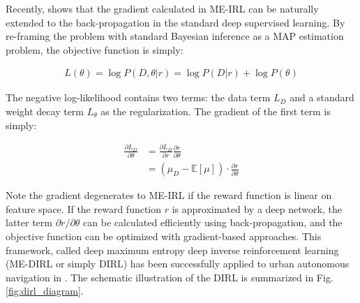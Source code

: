 \documentclass[../thesis.tex]{subfiles}
\begin{document}
Recently, \citet{wulfmeier2015maximum} shows that the gradient calculated in ME-IRL can be naturally extended to the back-propagation in the standard deep supervised learning.
By re-framing the problem with standard Bayesian inference as a MAP estimation problem, the objective function is simply:
 
\begin{align}
L(\theta) = \log P(D,\theta|r) = \log P(D|r) + \log P(\theta) \label{equ:dirl_obj}
\end{align}
 
The negative log-likelihood contains two terms: the data term $L_{D}$ and a standard weight decay term $L_{\theta}$ as the regularization.
The gradient of the first term is simply:
 
\begin{align}
\frac{\partial L_D}{\partial \theta} &= \frac{\partial L_D}{\partial r} \frac{\partial r}{\partial \theta} \\
&= (\mu_D - \mathbb{E}[\mu]) \cdot \frac{\partial r}{\partial \theta} \label{equ:dirl_grad}
\end{align}
 
Note the gradient degenerates to ME-IRL if the reward function is linear on feature space.
If the reward function $r$ is approximated by a deep network, the latter term $\partial r / \partial \theta$ can be calculated efficiently using back-propagation, and the objective function can be optimized with gradient-based approaches.
This framework, called deep maximum entropy deep inverse reinforcement learning (ME-DIRL or simply DIRL) has been successfully applied to urban autonomous navigation in \cite{wulfmeier2016watch}.
The schematic illustration of the DIRL is summarized in Fig. \ref{fig:dirl_diagram}.
 
 
 
 
\end{document}
